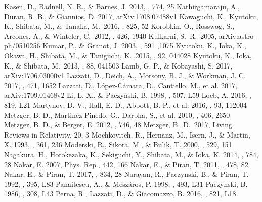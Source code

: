 \documentclass{emulateapj}
\begin{document}
{\begin{thebibliography}{}
Kasen, D., Badnell, N. R., \& Barnes, J. 2013, \apj, 774, 25
Kathirgamaraju, A., Duran, R. B., \& Giannios, D. 2017, arXiv:1708.07488v1
 Kawaguchi, K., Kyutoku, K., Shibata, M., \& Tanaka, M.\ 2016, \apj, 825, 52
 Korobkin, O., Rosswog, S., Arcones, A., \& Winteler, C.\ 2012, \mnras, 426, 1940
 Kulkarni, S.~R.\ 2005, arXiv:astro-ph/0510256
Kumar, P., \& Granot, J. 2003, \apj, 591 ,1075
 Kyutoku, K., Ioka, K., Okawa, H., Shibata, M., \& Taniguchi, K.\ 2015, \prd, 92, 044028
 Kyutoku, K., Ioka, K., \& Shibata, M.\ 2013, \prd, 88, 041503
Lamb, G. P., \& Kobayashi, S. 2017, arXiv:1706.03000v1
Lazzati, D., Deich, A., Morsony, B. J., \& Workman, J. C. 2017, \mnras, 471, 1652
Lazzati, D., L\'opez-C\'amara, D., Cantiello, M., et al. 2017, arXiv:1709.01468v2
Li, L. X., \& Paczy\'nski, B. 1998, \apj, 507, L59
Loeb, A. 2016, \apj, 819, L21
Martynov, D. V., Hall, E. D., Abbott, B. P., et al. 2016, \prd, 93, 112004
Metzger, B. D., Martinez-Pinedo, G., Darbha, S., et al. 2010, \mnras, 406, 2650
Metzger, B. D., \& Berger, E. 2012, \apj, 746, 48
 Metzger, B.~D.\ 2017, Living Reviews in Relativity, 20, 3
Mochkovitch, R., Hernanz, M., Isern, J., \& Martin, X. 1993, \nat, 361, 236
Moderski, R., Sikora, M., \& Bulik, T. 2000, \apj, 529, 151
Nagakura, H., Hotokezaka, K., Sekiguchi, Y., Shibata, M., \& Ioka, K. 2014, \apj, 784, 28
Nakar, E. 2007, Phys. Rep., 442, 166
Nakar, E., \& Piran, T. 2011, \nat, 478, 82
Nakar, E., \& Piran, T. 2017, \apj, 834, 28
Narayan, R., Paczynski, B., \& Piran, T. 1992, \apj, 395, L83
Panaitescu, A., \& M\'esz\'aros, P. 1998, \apj, 493, L31
Paczynski, B. 1986, \apj, 308, L43
Perna, R., Lazzati, D., \& Giacomazzo, B. 2016, \apj, 821, L18

\end{thebibliography}}
\end{document}
